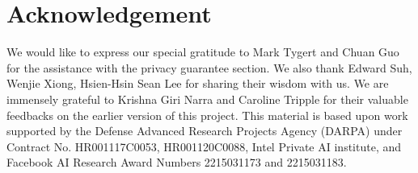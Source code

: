 \section*{Acknowledgement}
We would like to express our special gratitude to Mark Tygert and Chuan Guo for the assistance with the privacy guarantee section. We also thank Edward Suh, Wenjie Xiong, Hsien-Hsin Sean Lee for sharing their wisdom with us. We are immensely grateful to Krishna Giri Narra and Caroline Tripple for their valuable feedbacks on the earlier version of this project.
This material is based upon work supported by the Defense Advanced Research Projects Agency (DARPA) under Contract No. HR001117C0053, HR001120C0088, Intel Private AI institute, and Facebook AI Research Award Numbers 2215031173 and 2215031183.